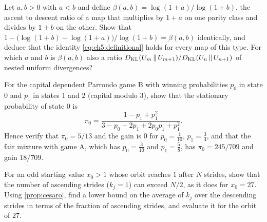 \begin{exercise}
Let $a,b>0$ with $a<b$ and define $\beta(a,b)=\log(1+a)/\log(1+b)$, the ascent
to descent ratio of a map that multiplies by $1+a$ on one parity class and
divides by $1+b$ on the other.  Show that
$1-\bigl(\log(1+b)-\log(1+a)\bigr)/\log(1+b)=\beta(a,b)$ identically, and
deduce that the identity \eqref{eq:ch5:definitional} holds for every map of
this type.  For which $a$ and $b$ is $\beta(a,b)$ also a ratio
$D_{\mathrm{KL}}(U_m\,\|\,U_{m+1})/D_{\mathrm{KL}}(U_n\,\|\,U_{n+1})$ of nested uniform divergences?
\end{exercise}

\begin{exercise}
For the capital dependent Parrondo game B with winning probabilities $p_0$ in
state $0$ and $p_1$ in states $1$ and $2$ (capital modulo $3$), show that the
stationary probability of state $0$ is
\[
  \pi_0=\frac{1-p_1+p_1^2}{3-p_0-2p_1+2p_0p_1+p_1^2}.
\]
Hence verify that $\pi_0=5/13$ and the gain is $0$ for $p_0=\tfrac1{10}$,
$p_1=\tfrac34$, and that the fair mixture with game A, which has $p_0=\tfrac3{10}$
and $p_1=\tfrac58$, has $\pi_0=245/709$ and gain $18/709$.
\end{exercise}

\begin{exercise}
For an odd starting value $x_0>1$ whose orbit reaches $1$ after $N$ strides,
show that the number of ascending strides ($k_j=1$) can exceed $N/2$, as it
does for $x_0=27$.  Using \cref{prop:cesaro}, find a lower bound on the
average of $k_j$ over the descending strides in terms of the fraction of
ascending strides, and evaluate it for the orbit of $27$.
\end{exercise}
